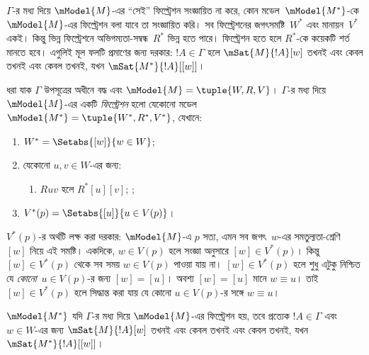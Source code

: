 \documentclass[../../../include/open-logic-section]{subfiles}
\begin{document}


$\Gamma$-র মধ্য দিয়ে $\mModel{M}$-এর “সেই” ফিল্ট্রেশন সংজ্ঞায়িত না করে, কোন মডেল~$\mModel{M^*}$-কে $\mModel{M}$-এর ফিল্ট্রেশন বলা যাবে তা সংজ্ঞায়িত করি। সব ফিল্ট্রেশনের জগৎসমষ্টি~$W^*$ এবং মানায়ন~$V^*$ একই। কিন্তু ভিন্ন ফিল্ট্রেশনে অভিগম্যতা-সম্বন্ধ~$R^*$ ভিন্ন হতে পারে। ফিল্ট্রেশন হতে হলে $R^*$-কে কয়েকটি শর্ত মানতে হবে। এগুলিই মূল ফলটি প্রমাণের জন্য দরকার: $!A \in \Gamma$ হলে $\mSat{M}{!A}[w]$ তখনই এবং কেবল তখনই এবং কেবল তখনই, যখন $\mSat{M^*}{!A}[{[w]}]$।

\begin{defn}
  ধরা যাক $\Gamma$ উপসূত্রের অধীনে বদ্ধ এবং $\mModel{M} = \tuple{W,
    R, V}$। $\Gamma$-র মধ্য দিয়ে $\mModel{M}$-এর একটি \emph{ফিল্ট্রেশন} হলো যেকোনো মডেল $\mModel{M^*} = \tuple{W^*,R^*,V^*}$, যেখানে:
  \begin{enumerate}
  \item $W^* = \Setabs{[w]}{w \in W}$;
  \item {}%
    যেকোনো $u,v \in W$-এর জন্য:
    \begin{enumerate}
    \item {}%
      $Ruv$ হলে $R^*[u][v]$;
    ;
    \end{enumerate}
  \item $V^*(p) = \Setabs{[u]}{u \in V(p)}$।
  \end{enumerate}
\end{defn}

$V^*(p)$-র অর্থটি লক্ষ করা দরকার: $\mModel{M}$-এ $p$ সত্য, এমন সব জগৎ~$w$-এর সমতুল্যতা-শ্রেণি~$[w]$ নিয়ে এই সমষ্টি। একদিকে, $w \in V(p)$ হলে সংজ্ঞা অনুসারে $[w] \in V^*(p)$। কিন্তু $[w] \in V^*(p)$ থেকে সব সময় $w \in V(p)$ পাওয়া যায় না। $[w] \in V^*(p)$ হলে শুধু এটুকু নিশ্চিত যে \emph{কোনো}~$u \in V(p)$-র জন্য $[w] = [u]$। অবশ্য $[w] = [u]$ মানে $w \equiv u$। তাই $[w] \in V^*(p)$ হলে সিদ্ধান্ত করা যায় যে কোনো $u \in V(p)$-র সঙ্গে $w \equiv u$।

\begin{thm}
  $\mModel{M^*}$ যদি $\Gamma$-র মধ্য দিয়ে $\mModel{M}$-এর ফিল্ট্রেশন হয়, তবে প্রত্যেক $!A \in \Gamma$ এবং $w \in W$-এর জন্য $\mSat{M}{!A}[w]$ তখনই এবং কেবল তখনই এবং কেবল তখনই, যখন $\mSat{M^*}{!A}[{[w]}]$।
\end{thm}
\end{document}
